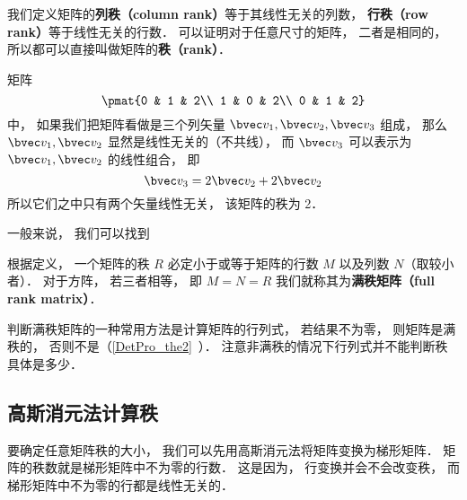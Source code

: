

我们定义矩阵的\textbf{列秩（column rank）}等于其线性无关的列数， \textbf{行秩（row rank）}等于线性无关的行数． 可以证明对于任意尺寸的矩阵， 二者是相同的， 所以都可以直接叫做矩阵的\textbf{秩（rank）}．

\begin{example}{}
矩阵
\begin{equation}
\pmat{0 & 1 & 2\\ 1 & 0 & 2\\ 0 & 1 & 2}
\end{equation}
中， 如果我们把矩阵看做是三个列矢量 $\bvec v_1, \bvec v_2, \bvec v_3$ 组成， 那么 $\bvec v_1, \bvec v_2$ 显然是线性无关的（不共线）， 而 $\bvec v_3$ 可以表示为 $\bvec v_1, \bvec v_2$ 的线性组合， 即
\begin{equation}
\bvec v_3 = 2\bvec v_2 + 2\bvec v_2
\end{equation}
所以它们之中只有两个矢量线性无关， 该矩阵的秩为 2．
\end{example}
一般来说， 我们可以找到

根据定义， 一个矩阵的秩 $R$ 必定小于或等于矩阵的行数 $M$ 以及列数 $N$（取较小者）． 对于方阵， 若三者相等， 即 $M = N = R$ 我们就称其为\textbf{满秩矩阵（full rank matrix）}．

判断满秩矩阵的一种常用方法是计算矩阵的行列式， 若结果不为零， 则矩阵是满秩的， 否则不是（\autoref{DetPro_the2}~）． 注意非满秩的情况下行列式并不能判断秩具体是多少．


\subsection{高斯消元法计算秩}
要确定任意矩阵秩的大小， 我们可以先用高斯消元法将矩阵变换为梯形矩阵． 矩阵的秩数就是梯形矩阵中不为零的行数． 这是因为， 行变换并会不会改变秩， 而梯形矩阵中不为零的行都是线性无关的．
